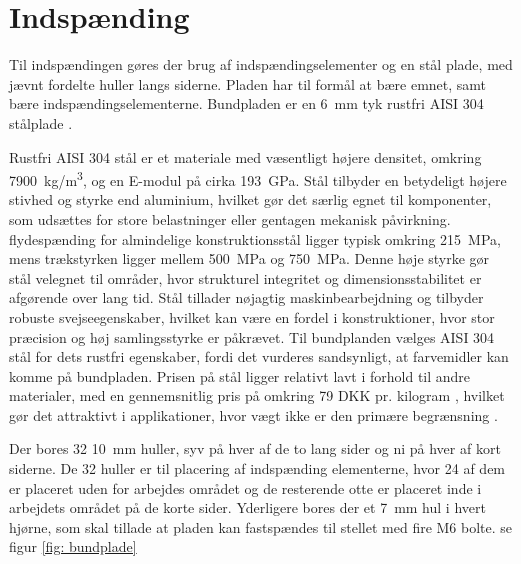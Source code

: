 \section{Indspænding} \label{Indspænding}

Til indspændingen gøres der brug af indspændingselementer og en stål plade, med jævnt fordelte huller langs siderne. Pladen har til formål at bære emnet, samt bære indspændingselementerne. Bundpladen er en \SI{6}{mm} tyk rustfri AISI 304 stålplade \parencite{Stalet2025KbMal}.

Rustfri AISI 304 stål er et materiale med væsentligt højere densitet, omkring \SI{7900}{kg/m^3}, og en E-modul på cirka \SI{193}{GPa}. Stål tilbyder en betydeligt højere stivhed og styrke end aluminium, hvilket gør det særlig egnet til komponenter, som udsættes for store belastninger eller gentagen mekanisk påvirkning. flydespænding for almindelige konstruktionsstål ligger typisk omkring \SI{215}{MPa}, mens trækstyrken ligger mellem \SI{500}{MPa} og \SI{750}{MPa}. Denne høje styrke gør stål velegnet til områder, hvor strukturel integritet og dimensionsstabilitet er afgørende over lang tid. Stål tillader nøjagtig maskinbearbejdning og tilbyder robuste svejseegenskaber, hvilket kan være en fordel i konstruktioner, hvor stor præcision og høj samlingsstyrke er påkrævet. Til bundplanden vælges AISI 304 stål for dets rustfri egenskaber, fordi det vurderes sandsynligt, at farvemidler kan komme på bundpladen. Prisen på stål ligger relativt lavt i forhold til andre materialer, med en gennemsnitlig pris på omkring 79 DKK pr. kilogram \parencite{Stalprofil}, hvilket gør det attraktivt i applikationer, hvor vægt ikke er den primære begrænsning \parencite{Jessen2011RustfritKorrosion}.


Der bores 32 \SI{10}{mm} huller, syv på hver af de to lang sider og ni på hver af kort siderne. De 32 huller er til placering af indspænding elementerne, hvor 24 af dem er placeret uden for arbejdes området og de resterende otte er placeret inde i arbejdets området på de korte sider. Yderligere bores der et \SI{7}{mm} hul i hvert hjørne, som skal tillade at pladen kan fastspændes til stellet med fire M6 bolte. se figur \ref{fig: bundplade}


